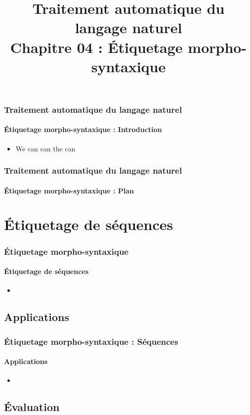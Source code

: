 \documentclass[xcolor=table]{beamer}
\title[TALN : 04- Étiquetage morpho-syntaxique]%
{Traitement automatique du langage naturel\\Chapitre 04 : Étiquetage morpho-syntaxique}
\begin{document}
	
\begin{frame}
\frametitle{Traitement automatique du langage naturel}
\framesubtitle{Étiquetage morpho-syntaxique : Introduction}

\begin{itemize}
	\item We can can the can
	
\end{itemize}

\end{frame}


\begin{frame}
\frametitle{Traitement automatique du langage naturel}
\framesubtitle{Étiquetage morpho-syntaxique : Plan}

\begin{multicols}{2}
\tableofcontents
\end{multicols}
\end{frame}

\section{Étiquetage de séquences}

\begin{frame}
\frametitle{Étiquetage morpho-syntaxique}
\framesubtitle{Étiquetage de séquences}


\begin{itemize}
	\item 
\end{itemize}

\end{frame}

\subsection{Applications}

\begin{frame}
\frametitle{Étiquetage morpho-syntaxique : Séquences}
\framesubtitle{Applications}

\begin{itemize}
	\item 
\end{itemize}

\end{frame}

\subsection{Évaluation}
\end{document}
